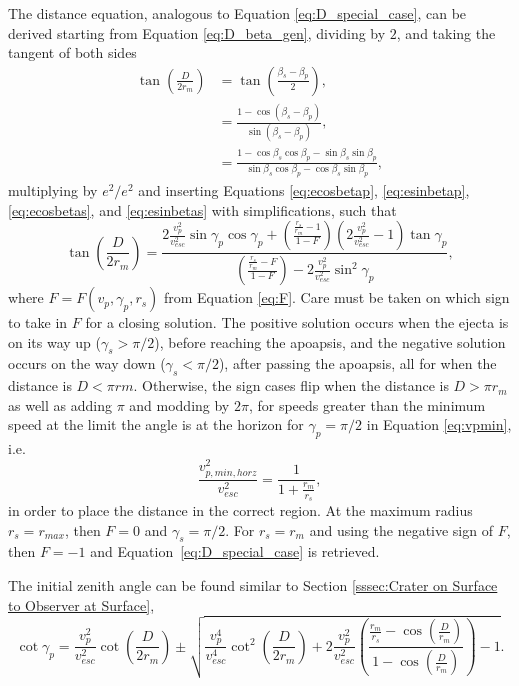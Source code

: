 \documentclass{article}
\begin{document}
The distance equation, analogous to Equation \eqref{eq:D_special_case}, can be derived starting from Equation \eqref{eq:D_beta_gen}, dividing by $2$, and taking the tangent of both sides
\begin{align}
\tan\left(\frac{D}{2r_m}\right) &= \tan\left(\frac{\beta_s-\beta_p}{2}\right),\nonumber\\\nonumber
&= \frac{1 - \cos(\beta_s-\beta_p)}{\sin(\beta_s-\beta_p)},\\\nonumber
&= \frac{1 - \cos\beta_s\cos\beta_p - \sin\beta_s\sin\beta_p}{\sin\beta_s\cos\beta_p - \cos\beta_s\sin\beta_p},
\end{align}
multiplying by $e^2/e^2$ and inserting Equations \eqref{eq:ecosbetap}, \eqref{eq:esinbetap}, \eqref{eq:ecosbetas}, and \eqref{eq:esinbetas} with simplifications, such that
\begin{equation}\label{eq:D_general_case}
\tan\left(\frac{D}{2r_m}\right) = \frac{2\frac{v_p^2}{v_{esc}^2}\sin\gamma_p\cos\gamma_p + \left(\frac{\frac{r_s}{r_m}-1}{1-F}\right)\left(2\frac{v_p^2}{v_{esc}^2}-1\right)\tan\gamma_p}{\left(\frac{\frac{r_s}{r_m}-F}{1-F}\right)-2\frac{v_p^2}{v_{esc}^2}\sin^2\gamma_p},
\end{equation}
where $F = F(v_p,\gamma_p,r_s)$ from Equation \eqref{eq:F}. Care must be taken on which sign to take in $F$ for a closing solution. The positive solution occurs when the ejecta is on its way up ($\gamma_s > \pi/2$), before reaching the apoapsis, and the negative solution occurs on the way down ($\gamma_s < \pi/2$), after passing the apoapsis, all for when the distance is $D < \pi rm$. Otherwise, the sign cases flip when the distance is $D > \pi r_m$ as well as adding $\pi$ and modding by $2\pi$, for speeds greater than the minimum speed at the limit the angle is at the horizon for $\gamma_p = \pi/2$ in Equation \eqref{eq:vpmin}, i.e.
\begin{equation}
\frac{v_{p,min,horz}^2}{v_{esc}^2} = \frac{1}{1+\frac{r_m}{r_s}},
\end{equation}
in order to place the distance in the correct region. At the maximum radius $r_s=r_{max}$, then $F=0$ and $\gamma_s=\pi/2$. For $r_s=r_m$ and using the negative sign of $F$, then $F=-1$ and Equation~\eqref{eq:D_special_case} is retrieved.

The initial zenith angle can be found similar to Section \ref{sssec:Crater on Surface to Observer at Surface},
\begin{equation}
\label{eq:generalcase gammap}
\cot\gamma_p = \frac{v_p^2}{v_{esc}^2}\cot\left(\frac{D}{2r_m}\right) \pm \sqrt{\frac{v_p^4}{v_{esc}^4}\cot^2\left(\frac{D}{2r_m}\right) + 2\frac{v_p^2}{v_{esc}^2}\left(\frac{\frac{r_m}{r_s}-\cos\left(\frac{D}{r_m}\right)}{1-\cos\left(\frac{D}{r_m}\right)}\right)-1}.
\end{equation}
\end{document}
